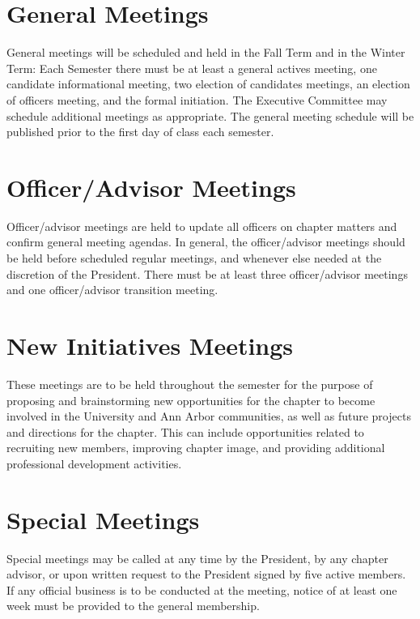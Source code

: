 \section{General Meetings}\label{sec:genmeetings} General meetings will be scheduled and held in the Fall Term and in the Winter Term: Each Semester there must be at least a general actives meeting, one candidate informational meeting, two election of candidates meetings,  an election of officers meeting, and the formal initiation. The Executive Committee may schedule additional meetings as appropriate. The general meeting schedule will be published prior to the first day of class each semester.


\section{Officer/Advisor Meetings} Officer/advisor meetings are held to update all officers on chapter
matters and confirm general meeting agendas.  In general, the
officer/advisor meetings should be held before scheduled regular
meetings, and whenever else needed at the discretion of the President.
There must be at least three officer/advisor meetings and one
officer/advisor transition meeting.

\section{New Initiatives Meetings} \label{sec:NImeetings}
These meetings are to be held throughout the semester for the purpose of proposing and brainstorming new opportunities for the chapter to become involved in the University and Ann Arbor communities, as well as future projects and directions for the chapter.  This can include opportunities related  to recruiting new members, improving chapter image, and providing additional professional development activities.

\section{Special Meetings} Special meetings may be called at any time by the President, by any chapter advisor, or upon written request to the President signed by five active members. If any official business is to be conducted at the meeting, notice of at least one week must be provided to the general membership.

